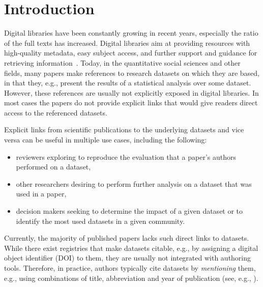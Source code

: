 \documentclass{IOS-Book-Article}
\begin{document}
\section{Introduction}
Digital libraries have been constantly growing in recent years, especially the ratio of the full texts has increased. 
Digital libraries aim at providing resources with high-quality metadata, easy subject access, and further support and guidance for retrieving information~\citep{Hienert2015}. 
Today, in the quantitative social sciences and other fields, many papers make references to research datasets on which they are based, in that they, e.g., present the results of a statistical analysis over some dataset.
However, these references are usually not explicitly exposed in digital libraries.
In most cases the papers do not provide explicit links that would give readers direct access to the referenced datasets. 

Explicit links from scientific publications to the underlying datasets and vice versa can be useful in multiple use cases, including the following:
\begin{itemize}
	\item reviewers exploring to reproduce the evaluation that a paper's authors performed on a dataset, 
	\item other researchers desiring to perform further analysis on a dataset that was used in a paper,
        \item decision makers seeking to determine the impact of a given dataset or to identify the most used datasets in a given community.
\end{itemize}%

Currently, the majority of published papers lacks such direct links to datasets.
While there exist registries that make datasets citable, e.g., by assigning a digital object identifier (DOI) to them, they are usually not integrated with authoring tools.
Therefore, in practice, authors typically cite datasets by \emph{mentioning} them, e.g., using  
combinations of title, abbreviation and year of publication (see, e.g., \citet{Mathiak2015}).  
\end{document}
